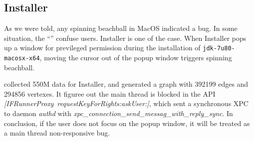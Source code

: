 \subsection{Installer}

As we were told, any spinning beachball in MacOS indicated a bug. In some
situation, the ``'' confuse users. Installer is one of the case. When
Installer pops up a window for previleged permission during the installation of
\texttt{jdk-7u80-macosx-x64}, moving the cursor out of the popup window triggers
spinning beachball.

\xxx collected 550M data for Installer, and generated a graph with
392199 edges and 294856 vertexes. It figuree out the main thread is
blocked in the API \textit{[IFRunnerProxy\ requestKeyForRights:askUser:]},
which sent a synchronous XPC to daemon \textit{authd} with
\textit{xpc\_connection\_send\_messag\_with\_reply\_sync}. In conclusion, if the
user does not focus on the popup window, it will be treated as a main thread
non-responsive bug.
